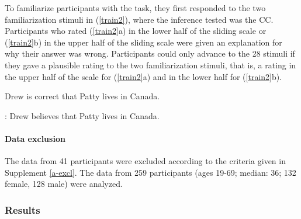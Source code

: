 \documentclass[11pt,fleqn]{article}
\newcommand{\6}{\mbox{$[\hspace*{-.6mm}[$}}
\newcommand{\9}{\mbox{$]\hspace*{-.6mm}]$}}
\begin{document}
To familiarize participants with the task, they first responded to the two familiarization stimuli in (\ref{train2}), where the inference tested was the CC. Participants who rated (\ref{train2}a) in the lower half of the sliding scale or (\ref{train2}b) in the upper half of the sliding scale were given an explanation for why their answer was wrong. Participants could only advance to the 28 stimuli if they gave a plausible rating to the two familiarization stimuli, that is, a rating in the upper half of the scale for (\ref{train2}a) and in the lower half for (\ref{train2}b).

\begin{exe}
\ex\label{train2}
\begin{xlist}
 Drew is correct that Patty lives in Canada. 

: Drew believes that Patty lives in Canada.
\end{xlist}
\end{exe}


\paragraph{Data exclusion} The data from 41 participants were excluded according to the criteria given in Supplement \ref{a-excl}. The data from 259 participants (ages 19-69; median: 36; 132 female, 128 male) were analyzed.


\subsubsection{Results}
\end{document}
